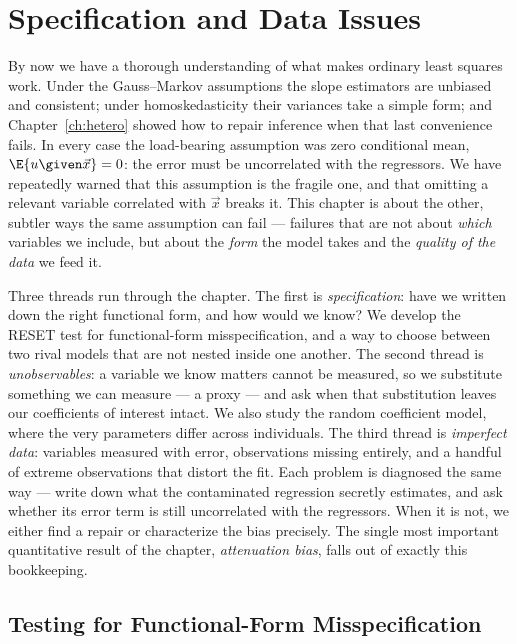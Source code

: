\chapter{Specification and Data Issues}
\label{ch:specification}

By now we have a thorough understanding of what makes ordinary least squares work. Under the Gauss--Markov assumptions the slope estimators are unbiased and consistent; under homoskedasticity their variances take a simple form; and Chapter~\ref{ch:hetero} showed how to repair inference when that last convenience fails. In every case the load-bearing assumption was zero conditional mean, $\E{u \given \vec x}=0$: the error must be uncorrelated with the regressors. We have repeatedly warned that this assumption is the fragile one, and that omitting a relevant variable correlated with $\vec x$ breaks it. This chapter is about the other, subtler ways the same assumption can fail --- failures that are not about \emph{which} variables we include, but about the \emph{form} the model takes and the \emph{quality of the data} we feed it.

Three threads run through the chapter. The first is \emph{specification}: have we written down the right functional form, and how would we know? We develop the RESET test for functional-form misspecification, and a way to choose between two rival models that are not nested inside one another. The second thread is \emph{unobservables}: a variable we know matters cannot be measured, so we substitute something we can measure --- a proxy --- and ask when that substitution leaves our coefficients of interest intact. We also study the random coefficient model, where the very parameters differ across individuals. The third thread is \emph{imperfect data}: variables measured with error, observations missing entirely, and a handful of extreme observations that distort the fit. Each problem is diagnosed the same way --- write down what the contaminated regression secretly estimates, and ask whether its error term is still uncorrelated with the regressors. When it is not, we either find a repair or characterize the bias precisely. The single most important quantitative result of the chapter, \emph{attenuation bias}, falls out of exactly this bookkeeping.

\section{Testing for Functional-Form Misspecification}


